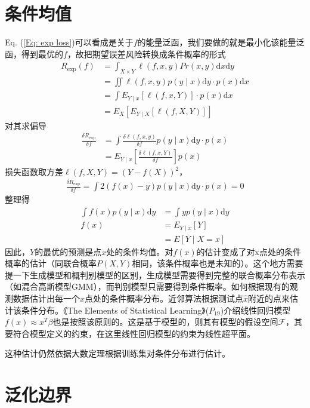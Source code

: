 \section{条件均值}
Eq. (\ref{Eq: exp loss})可以看成是关于$f$的能量泛函，我们要做的就是最小化该能量泛函，得到最优的$f$，故把期望误差风险转换成条件概率的形式
\begin{equation}\label{Eq: exp loss conditional}
\begin{split}
  R_{\textrm{exp}}(f) &= \int_{X\times Y}\ell(f,x,y)Pr(x,y)\mathrm{d}x\mathrm{d}y \\
    & = \iint\ell(f,x,y)p(y\mid x)\mathrm{d}y \cdot p(x)\mathrm{d}x \\
    & = \int E_{Y\mid x}[\ell(f,x,Y)]\cdot p(x)\mathrm{d}x \\
    & = E_X[E_{Y\mid X}[\ell(f,X,Y)]]
\end{split}
\end{equation}
对其求偏导
\begin{equation}\label{Eq: partial derv of Exp loss}
\begin{split}
  \frac{\delta R_{\textrm{exp}}}{\delta f} &= \int \frac{\delta \ell(f,x,y)}{\delta f}p(y\mid x)\mathrm{d}y \cdot p(x) \\
    & = E_{Y\mid x}[\frac{\delta \ell(f,x,Y)}{\delta f}]p(x)
\end{split}
\end{equation}
损失函数取方差$\ell(f,X,Y) = (Y-f(X))^2$，
\begin{equation}
\begin{split}
  \frac{\delta R_{\textrm{exp}}}{\delta f} = \int 2(f(x)-y) p(y\mid x) \mathrm{d}y \cdot p(x) = 0
\end{split}
\end{equation}
整理得
\begin{equation}
\begin{split}
    \int f(x)p(y\mid x)\mathrm{d}y &= \int yp(y\mid x)\mathrm{d}y \\
    f(x) &= E_{Y\mid x}[Y] \\
        & = E[Y\mid X=x]
\end{split}
\end{equation}
因此，$Y$的最优的预测是点$x$处的条件均值。对$f(x)$的估计变成了对x点处的条件概率的估计（同联合概率$P(X,Y)$相同，该条件概率也是未知的）。这个地方需要提一下生成模型和概判别模型的区别，生成模型需要得到完整的联合概率分布表示（如混合高斯模型GMM），而判别模型只需要得到条件概率。如何根据现有的观测数据估计出每一个$x$点处的条件概率分布。近邻算法根据测试点$\hat{x}$附近的点来估计该条件分布。《The Elements of Statistical Learning》($P_{19}$)介绍线性回归模型$f(x)\approx x^T\beta$也是按照该原则的。这是基于模型的，则其有模型的假设空间$\mathcal{F}$，其要符合模型定义的约束，在这里线性回归模型的约束为线性超平面。

 
这种估计仍然依据大数定理根据训练集对条件分布进行估计。

\section{泛化边界}

